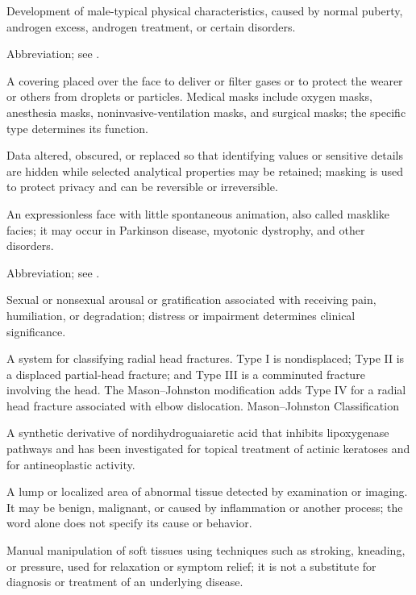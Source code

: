  Development of male-typical physical characteristics, caused by normal puberty, androgen excess, androgen treatment, or certain disorders.

 Abbreviation; see .

 A covering placed over the face to deliver or filter gases or to protect the wearer or others from droplets or particles. Medical masks include oxygen masks, anesthesia masks, noninvasive-ventilation masks, and surgical masks; the specific type determines its function.

 Data altered, obscured, or replaced so that identifying values or sensitive details are hidden while selected analytical properties may be retained; masking is used to protect privacy and can be reversible or irreversible.

 An expressionless face with little spontaneous animation, also called masklike facies; it may occur in Parkinson disease, myotonic dystrophy, and other disorders.

 Abbreviation; see .

 Sexual or nonsexual arousal or gratification associated with receiving pain, humiliation, or degradation; distress or impairment determines clinical significance.

 A system for classifying radial head fractures. Type I is nondisplaced; Type II is a displaced partial-head fracture; and Type III is a comminuted fracture involving the head. The Mason--Johnston modification adds Type IV for a radial head fracture associated with elbow dislocation.
\synonyms
Mason--Johnston Classification

 A synthetic derivative of nordihydroguaiaretic acid that inhibits lipoxygenase pathways and has been investigated for topical treatment of actinic keratoses and for antineoplastic activity.

 A lump or localized area of abnormal tissue detected by examination or imaging. It may be benign, malignant, or caused by inflammation or another process; the word alone does not specify its cause or behavior.

 Manual manipulation of soft tissues using techniques such as stroking, kneading, or pressure, used for relaxation or symptom relief; it is not a substitute for diagnosis or treatment of an underlying disease.


